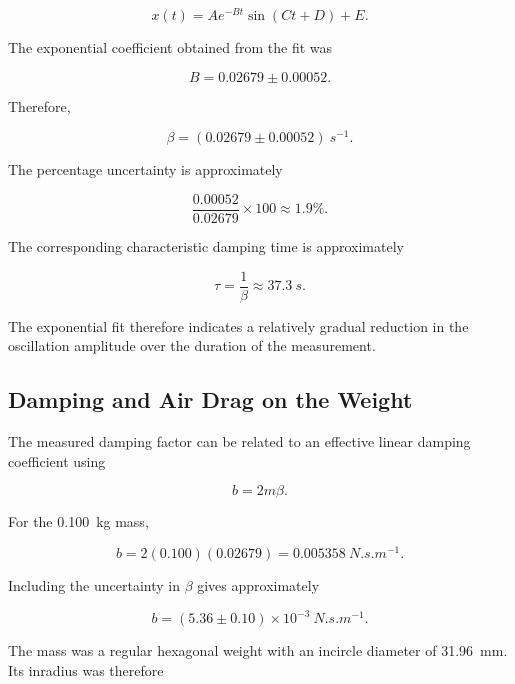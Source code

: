 \documentclass[12pt,a4paper]{article}
\begin{document}
\begin{equation}
x(t)=Ae^{-Bt}\sin(Ct+D)+E.
\end{equation}

The exponential coefficient obtained from the fit was

\begin{equation}
B=0.02679\pm0.00052.
\end{equation}

Therefore,

\begin{equation}
\boxed{
\beta=(0.02679\pm0.00052)\ \si{s^{-1}}
}.
\end{equation}

The percentage uncertainty is approximately

\begin{equation}
\frac{0.00052}{0.02679}\times100
\approx1.9\%.
\end{equation}

The corresponding characteristic damping time is approximately

\begin{equation}
\tau=\frac{1}{\beta}
\approx\SI{37.3}{s}.
\end{equation}

The exponential fit therefore indicates a relatively gradual reduction in the oscillation amplitude over the duration of the measurement.

\subsection{Damping and Air Drag on the Weight}

The measured damping factor can be related to an effective linear damping coefficient using

\begin{equation}
b=2m\beta.
\end{equation}

For the \SI{0.100}{kg} mass,

\begin{equation}
b
=
2(0.100)(0.02679)
=
\SI{0.005358}{N.s.m^{-1}}.
\end{equation}

Including the uncertainty in $\beta$ gives approximately

\begin{equation}
\boxed{
b=(5.36\pm0.10)\times10^{-3}
\ \si{N.s.m^{-1}}
}.
\end{equation}

The mass was a regular hexagonal weight with an incircle diameter of \SI{31.96}{mm}. Its inradius was therefore
\end{document}
